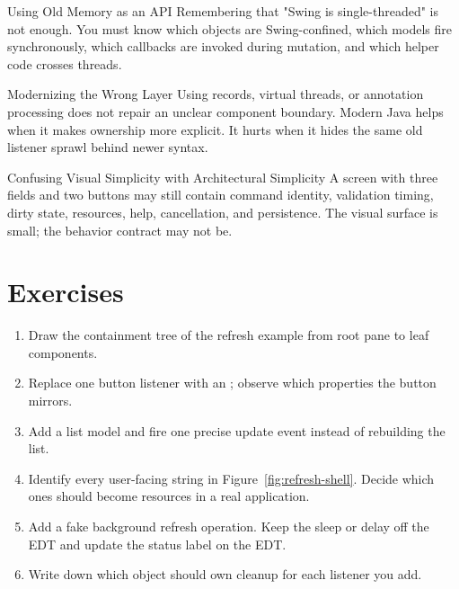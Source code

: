 \begin{pitfallbox}{Using Old Memory as an API}
Remembering that "Swing is single-threaded" is not enough. You must know which objects are Swing-confined, which models fire synchronously, which callbacks are invoked during mutation, and which helper code crosses threads.
\end{pitfallbox}

\begin{pitfallbox}{Modernizing the Wrong Layer}
Using records, virtual threads, or annotation processing does not repair an unclear component boundary. Modern Java helps when it makes ownership more explicit. It hurts when it hides the same old listener sprawl behind newer syntax.
\end{pitfallbox}

\begin{pitfallbox}{Confusing Visual Simplicity with Architectural Simplicity}
A screen with three fields and two buttons may still contain command identity, validation timing, dirty state, resources, help, cancellation, and persistence. The visual surface is small; the behavior contract may not be.
\end{pitfallbox}

\section{Exercises}

\begin{exercisebox}
\begin{enumerate}
\item Draw the containment tree of the refresh example from root pane to leaf components.
\item Replace one button listener with an ; observe which properties the button mirrors.
\item Add a list model and fire one precise update event instead of rebuilding the list.
\item Identify every user-facing string in Figure~\ref{fig:refresh-shell}. Decide which ones should become resources in a real application.
\item Add a fake background refresh operation. Keep the sleep or delay off the EDT and update the status label on the EDT.
\item Write down which object should own cleanup for each listener you add.
\end{enumerate}
\end{exercisebox}

